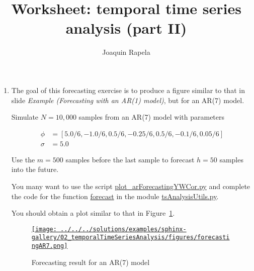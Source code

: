 \documentclass[12pt]{article}
\title{Worksheet: temporal time series analysis (part II)}
\author{Joaquin Rapela}
\begin{document}
\maketitle

\begin{enumerate}

    \item The goal of this forecasting exercise is to produce a figure similar
        to that in slide \emph{Example (Forecasting with an AR(1) model)}, but
        for an AR(7) model.

        Simulate $N=10,000$ samples from an AR(7) model with parameters

        \begin{align*}
            \phi&=[5.0/6,-1.0/6,0.5/6,-0.25/6,0.5/6,-0.1/6,0.05/6]\\
            \sigma&=5.0
        \end{align*}


        \noindent Use the $m=500$ samples before the last sample to forecast $h=50$ samples into
        the future.

        You many want to use the script
        \href{https://github.com/joacorapela/statNeuro2025/blob/master/worksheets/02\_temporalTimeSeriesAnalysis/plot\_arForecastingYWCor.py}{plot\_arForecastingYWCor.py}
        and complete the code for the function
        \href{https://github.com/joacorapela/statNeuro2025/blob/6cfd79b15e698f4522eec97017f5471a4ff67633/worksheets/02\_temporalTimeSeriesAnalysis/tsAnalysisUtils.py\#L53}{forecast}
        in the module
        \href{https://github.com/joacorapela/statNeuro2025/blob/master/worksheets/02\_temporalTimeSeriesAnalysis/tsAnalysisUtils.py}{tsAnalysisUtils.py}.

        You should obtain a plot similar to that in
        Figure~\ref{fig:forecasting}.

        \begin{figure}
            \begin{center}
                \href{}{\texttt{[image: ../../../solutions/examples/sphinx-gallery/02\_temporalTimeSeriesAnalysis/figures/forecastingAR7.png]}}
            \end{center}
            \caption{Forecasting result for an AR(7) model}
            \label{fig:forecasting}
        \end{figure}


\end{enumerate}
\end{document}
